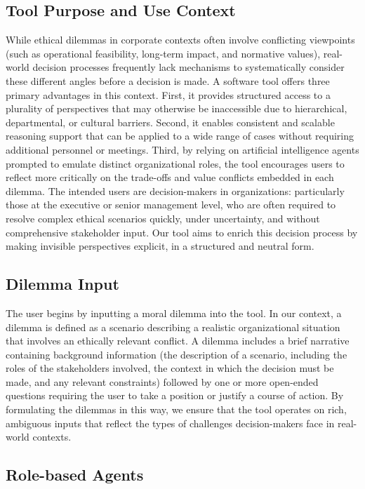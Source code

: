 \subsection{Tool Purpose and Use Context}

While ethical dilemmas in corporate contexts often involve conflicting viewpoints (such as operational feasibility, long-term impact, and normative values), real-world decision processes frequently lack mechanisms to systematically consider these different angles before a decision is made.
A software tool offers three primary advantages in this context. First, it provides structured access to a plurality of perspectives that may otherwise be inaccessible due to hierarchical, departmental, or cultural barriers. Second, it enables consistent and scalable reasoning support that can be applied to a wide range of cases without requiring additional personnel or meetings. Third, by relying on artificial intelligence agents prompted to emulate distinct organizational roles, the tool encourages users to reflect more critically on the trade-offs and value conflicts embedded in each dilemma.
The intended users are decision-makers in organizations: particularly those at the executive or senior management level, who are often required to resolve complex ethical scenarios quickly, under uncertainty, and without comprehensive stakeholder input. Our tool aims to enrich this decision process by making invisible perspectives explicit, in a structured and neutral form.

\subsection{Dilemma Input}

The user begins by inputting a moral dilemma into the tool.
In our context, a dilemma is defined as a scenario describing a realistic organizational situation that involves an ethically relevant conflict. A dilemma includes a brief narrative containing background information (the description of a scenario, including the roles of the stakeholders involved, the context in which the decision must be made, and any relevant constraints) followed by one or more open-ended questions requiring the user to take a position or justify a course of action.
By formulating the dilemmas in this way, we ensure that the tool operates on rich, ambiguous inputs that reflect the types of challenges decision-makers face in real-world contexts.

\subsection{Role-based Agents}

